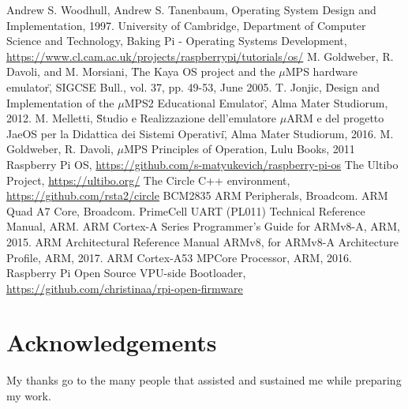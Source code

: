 \documentclass[12pt,a4paper,openright,twoside]{report}
\begin{document}
\begin{thebibliography}{90}             %
 Andrew S. Woodhull, Andrew S. Tanenbaum, 
                Operating System Design and Implementation, 1997.
 University of Cambridge, Department of Computer Science and Technology,
                    Baking Pi - Operating Systems Development,
                    \url{https://www.cl.cam.ac.uk/projects/raspberrypi/tutorials/os/}
 M. Goldweber, R. Davoli, and M. Morsiani,
                        \"The Kaya OS project and the $\mu$MPS hardware emulator\",
                          SIGCSE Bull., vol. 37, pp. 49-53, June 2005.
 T. Jonjic,
                    \"Design and Implementation of the $\mu$MPS2 Educational Emulator\",
                    Alma Mater Studiorum, 2012.
 M. Melletti,
                    \"Studio e Realizzazione dell'emulatore $\mu$ARM e del progetto
                    JaeOS per la Didattica dei Sistemi Operativi\",
                    Alma Mater Studiorum, 2016.
 M. Goldweber, R. Davoli, $\mu$MPS Principles of Operation, Lulu Books, 2011
 Raspberry Pi OS, \url{https://github.com/s-matyukevich/raspberry-pi-os}
 The Ultibo Project, \url{https://ultibo.org/}
 The Circle C++ environment, \url{https://github.com/rsta2/circle}
 BCM2835 ARM Peripherals, Broadcom.
 ARM Quad A7 Core, Broadcom.
 PrimeCell UART (PL011) Technical Reference Manual, ARM.
 ARM Cortex-A Series Programmer's Guide for ARMv8-A, ARM, 2015.
 ARM Architectural Reference Manual ARMv8, for ARMv8-A Architecture Profile, ARM, 2017.
 ARM Cortex-A53 MPCore Processor, ARM, 2016.
 Raspberry Pi Open Source VPU-side Bootloader, \url{https://github.com/christinaa/rpi-open-firmware}
\end{thebibliography}
\clearpage{\pagestyle{empty}\cleardoublepage}
\chapter*{Acknowledgements}
\thispagestyle{empty}
\setlength{\parindent}{0cm}
My thanks go to the many people that assisted and sustained me while preparing 
my work.\\
\end{document}
